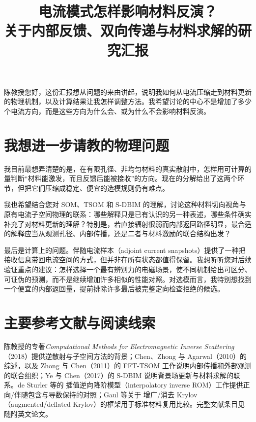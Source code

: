 \documentclass[UTF8,a4paper,11pt,fontset=none]{ctexart}
\title{电流模式怎样影响材料反演？\\关于内部反馈、双向传递与材料求解的研究汇报}
\author{}\date{}
\begin{document}
\maketitle\vspace{-2em}
陈教授您好，这份汇报想从问题的来由讲起，说明我如何从电流压缩走到材料更新的物理机制，以及计算结果让我怎样调整方法。我希望讨论的中心不是增加了多少个电流方向，而是这些方向为什么会、或为什么不会影响材料反演。




\section{我想进一步请教的物理问题}
我目前最想弄清楚的是，在有限孔径、非均匀材料的真实散射中，怎样用可计算的量判断“材料能激发，而且反馈后能被接收”的方向。现在的分解给出了这两个环节，但把它们压缩成稳定、便宜的选模规则仍有难点。

我也希望结合您对 SOM、TSOM 和 S-DBIM 的理解，讨论这种材料切向视角与原有电流子空间物理的联系：哪些解释只是已有认识的另一种表述，哪些条件确实补充了对材料更新的理解？特别是，若直接辐射很弱而内部返回路径明显，最合适的解释应当从观测孔径、内部传播，还是二者与材料激励的联合结构出发？

最后是计算上的问题。伴随电流样本（adjoint current snapshots）提供了一种把接收信息带回电流空间的方式，但并非在所有状态都值得保留。我想听听您对后续验证重点的建议：怎样选择一个最有辨别力的电磁场景，使不同机制给出可区分、可证伪的预测，而不是继续增加许多相似的性能对照。对选模而言，我特别想找到一个便宜的内部返回量，提前排除许多最后被完整定向检查拒绝的候选。
\section*{主要参考文献与阅读线索}
陈教授的专著\emph{Computational Methods for Electromagnetic Inverse Scattering}（2018）提供逆散射与子空间方法的背景；Chen、Zhong 与 Agarwal（2010）的综述，以及 Zhong 与 Chen（2011）的 FFT-TSOM 工作说明内部传播和外部观测的联合组织；Ye 与 Chen（2017）的 S-DBIM 说明背景场更新与材料求解的联系。de Sturler 等的 插值逆向降阶模型（interpolatory inverse ROM）工作提供正向/伴随包含与导数保持的对照；Gaul 等关于 增广/消去 Krylov（augmented/deflated Krylov）的框架用于标准材料复用比较。完整文献条目见随附英文论文。
\end{document}
